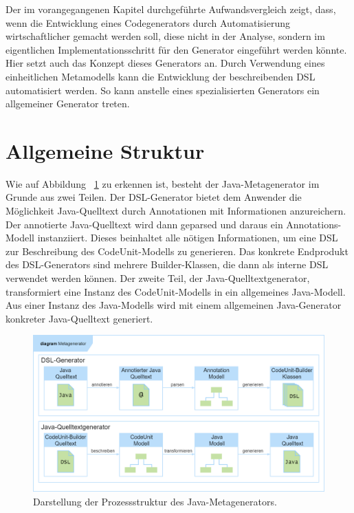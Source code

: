 \documentclass[12pt,oneside,a4paper,parskip]{scrbook}
\begin{document}
Der im vorangegangenen Kapitel durchgeführte Aufwandsvergleich zeigt, dass, wenn die Entwicklung eines Codegenerators durch Automatisierung wirtschaftlicher gemacht werden soll, diese nicht in der Analyse, sondern im eigentlichen Implementationsschritt für den Generator eingeführt werden könnte. Hier setzt auch das Konzept dieses Generators an. Durch Verwendung eines einheitlichen Metamodells kann die Entwicklung der beschreibenden DSL automatisiert werden. So kann anstelle eines spezialisierten Generators ein allgemeiner Generator treten.

\section{Allgemeine Struktur}

Wie auf Abbildung ~\ref{fig:meta1} zu erkennen ist, besteht der Java-Metagenerator im Grunde aus zwei Teilen. Der DSL-Generator bietet dem Anwender die Möglichkeit Java-Quelltext durch Annotationen mit Informationen anzureichern. Der annotierte Java-Quelltext wird dann geparsed und daraus ein Annotations-Modell instanziiert. Dieses beinhaltet alle nötigen Informationen, um eine DSL zur Beschreibung des CodeUnit-Modells zu generieren. Das konkrete Endprodukt des DSL-Generators sind mehrere Builder-Klassen, die dann als interne DSL verwendet werden können. Der zweite Teil, der Java-Quelltextgenerator, transformiert eine Instanz des CodeUnit-Modells in ein allgemeines Java-Modell. Aus einer Instanz des Java-Modells wird mit einem allgemeinen Java-Generator konkreter Java-Quelltext generiert.

\begin{figure}[htbp]
\centering
\includegraphics[width=1.0\textwidth]{bilder/metagenProzess}
\caption{Darstellung der Prozessstruktur des Java-Metagenerators.}
\label{fig:meta1}
\end{figure}
\end{document}

